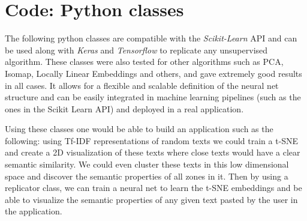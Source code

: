 \documentclass[a4paper,11pt,spanish]{report}
\begin{document}
\section{Code: Python classes}
\label{codeclasses}

The following python classes are compatible with the \textit{Scikit-Learn} API and can be used along with \textit{Keras} and \textit{Tensorflow} to replicate any unsupervised algorithm. These classes were also tested for other algorithms such as PCA, Isomap, Locally Linear Embeddings and others, and gave extremely good results in all cases. It allows for a flexible and scalable definition of the neural net structure and can be easily integrated in machine learning pipelines (such as the ones in the Scikit Learn API) and deployed in a real application.

Using these classes one would be able to build an application such as the following: using Tf-IDF representations of random texts we could train a t-SNE and create a 2D visualization of these texts where close texts would have a clear semantic similarity. We could even cluster these texts in this low dimensional space and discover the semantic properties of all zones in it. Then by using a replicator class, we can train a neural net to learn the t-SNE embeddings and be able to visualize the semantic properties of any given text pasted by the user in the application.

\inputminted[baselinestretch=1, fontsize=\scriptsize, breaklines]{python}{classes.py}



\label{chap:bib}

\nocite{*}

% 


\end{document}
